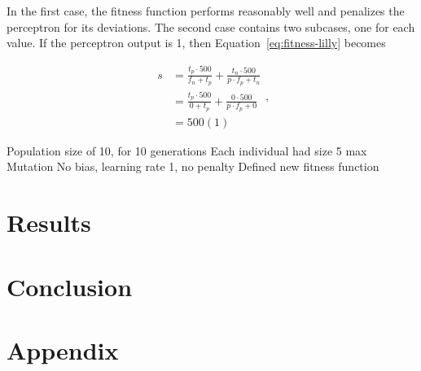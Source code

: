 \documentclass[conference]{IEEEtran}
\begin{document}
In the first case, the fitness function performs reasonably well and penalizes the perceptron for its deviations. The second case contains two subcases, one for each value. If the perceptron output is 1, then Equation~\ref{eq:fitness-lilly} becomes

\begin{equation}
  \begin{split}
    s & = \frac{t_p \cdot 500}{f_n + t_p} + \frac{t_n \cdot 500}{p \cdot f_p+ t_n}\\
    & = \frac{t_p \cdot 500}{0 + t_p} + \frac{0 \cdot 500}{p \cdot f_p + 0}\\
    & = 500(1)
  \end{split},
  \label{eq:fitness-lilly-decompose}
\end{equation}

Population size of 10, for 10 generations
Each individual had size 5 max
Mutation
No bias, learning rate 1, no penalty
Defined new fitness function


\section{Results}
\section{Conclusion}
\section{Appendix}
%


\end{document}
